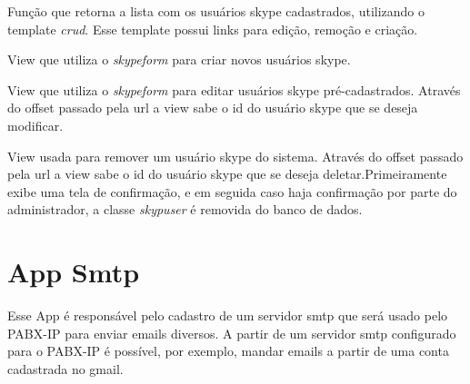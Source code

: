 \documentclass[letterpaper,10pt,brazil]{sphinxmanual}
\begin{document}
\begin{fulllineitems}
\label{apps/skypelist:skypelist.views.index}
Função que retorna a lista com os usuários skype cadastrados, utilizando o template \emph{crud}. Esse template possui links para edição, remoção e criação.

\end{fulllineitems}


\begin{fulllineitems}
\label{apps/skypelist:skypelist.views.create}
View que utiliza o \emph{skypeform} para criar novos usuários skype.

\end{fulllineitems}


\begin{fulllineitems}
\label{apps/skypelist:skypelist.views.edit}
View que utiliza o \emph{skypeform} para editar usuários skype pré-cadastrados. Através do offset passado pela url a view sabe o id do usuário skype que se deseja modificar.

\end{fulllineitems}



\begin{fulllineitems}
View usada para remover um usuário skype do sistema. Através do offset passado pela url a view sabe o id do usuário skype que se deseja deletar.Primeiramente exibe uma tela de confirmação, e em seguida caso haja confirmação por parte do administrador, a classe \emph{skypuser} é removida do banco de dados.

\end{fulllineitems}



\section{App Smtp}
\label{apps/smtp:smtp}\label{apps/smtp:app-smtp}\label{apps/smtp::doc}
Esse App é responsável pelo cadastro de um servidor smtp que será usado pelo PABX-IP para enviar emails diversos. A partir de um servidor smtp configurado para o PABX-IP é possível, por exemplo, mandar emails a partir de uma conta cadastrada no gmail.
\end{document}
